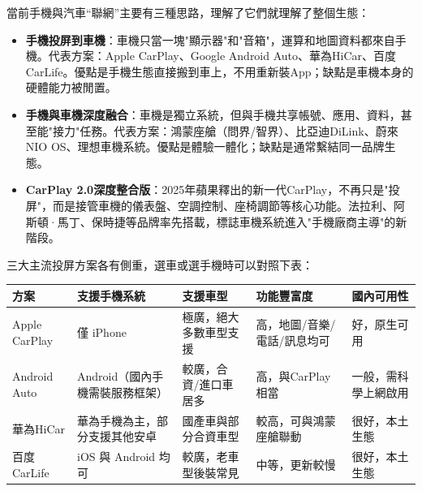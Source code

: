 


當前手機與汽車“聯網”主要有三種思路，理解了它們就理解了整個生態：

\begin{itemize}
  \item \textbf{手機投屏到車機}：車機只當一塊"顯示器"和"音箱"，運算和地圖資料都來自手機。代表方案：Apple CarPlay、Google Android Auto、華為HiCar、百度CarLife。優點是手機生態直接搬到車上，不用重新裝App；缺點是車機本身的硬體能力被閒置。
  \item \textbf{手機與車機深度融合}：車機是獨立系統，但與手機共享帳號、應用、資料，甚至能"接力"任務。代表方案：鴻蒙座艙（問界/智界）、比亞迪DiLink、蔚來NIO OS、理想車機系統。優點是體驗一體化；缺點是通常繫結同一品牌生態。
  \item \textbf{CarPlay 2.0深度整合版}：2025年蘋果釋出的新一代CarPlay，不再只是"投屏"，而是接管車機的儀表盤、空調控制、座椅調節等核心功能。法拉利、阿斯頓·馬丁、保時捷等品牌率先搭載，標誌車機系統進入"手機廠商主導"的新階段。
\end{itemize}


三大主流投屏方案各有側重，選車或選手機時可以對照下表：

\begin{center}
\begin{tabularx}{\linewidth}{|X|X|X|X|X|}
\hline
\textbf{方案} & \textbf{支援手機系統} & \textbf{支援車型} & \textbf{功能豐富度} & \textbf{國內可用性} \tabularnewline
\hline
Apple CarPlay & 僅 iPhone & 極廣，絕大多數車型支援 & 高，地圖/音樂/電話/訊息均可 & 好，原生可用 \tabularnewline
Android Auto & Android（國內手機需裝服務框架） & 較廣，合資/進口車居多 & 高，與CarPlay相當 & 一般，需科學上網啟用 \tabularnewline
華為HiCar & 華為手機為主，部分支援其他安卓 & 國產車與部分合資車型 & 較高，可與鴻蒙座艙聯動 & 很好，本土生態 \tabularnewline
百度CarLife & iOS 與 Android 均可 & 較廣，老車型後裝常見 & 中等，更新較慢 & 很好，本土生態 \tabularnewline
\hline
\end{tabularx}
\end{center}


